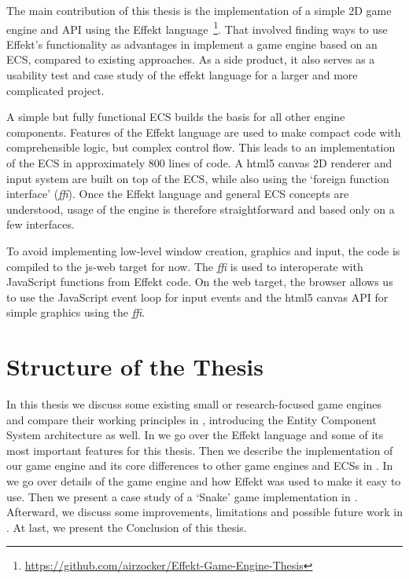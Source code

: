 The main contribution of this thesis is the implementation of a simple 2D game engine and API using the Effekt language~\footnote{\url{https://github.com/airzocker/Effekt-Game-Engine-Thesis}}. That involved finding ways to use Effekt's functionality as advantages in implement a game engine based on an ECS, compared to existing approaches. As a side product, it also serves as a usability test and case study of the effekt language for a larger and more complicated project.

A simple but fully functional ECS builds the basis for all other engine components. Features of the Effekt language are used to make compact code with comprehensible logic, but complex control flow. This leads to an implementation of the ECS in approximately 800 lines of code. A html5 \textsf{canvas} 2D renderer and input system are built on top of the ECS, while also using the `foreign function interface' (\textit{ffi}). Once the Effekt language and general ECS concepts are understood, usage of the engine is therefore straightforward and based only on a few interfaces.

To avoid implementing low-level window creation, graphics and input, the code is compiled to the \textsf{js-web} target for now. The \textit{ffi} is used to interoperate with JavaScript functions from Effekt code. On the web target, the browser allows us to use the JavaScript event loop for input events and the html5 \textsf{canvas} API for simple graphics using the \textit{ffi}.

\section*{Structure of the Thesis}

In this thesis we discuss some existing small or research-focused game engines and compare their working principles in , introducing the Entity Component System architecture as well. In  we go over the Effekt language and some of its most important features for this thesis. Then we describe the implementation of our game engine and its core differences to other game engines and ECSs in . In  we go over details of the game engine and how Effekt was used to make it easy to use. Then we present a case study of a `Snake' game implementation in . Afterward, we discuss some improvements, limitations and possible future work in . At last, we present the Conclusion of this thesis.
